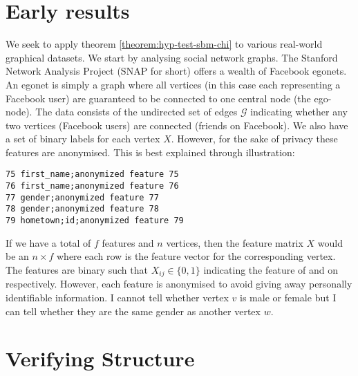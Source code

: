 \documentclass[]{article}
\newcommand{\Gcal}{\mathcal{G}}
\begin{document}
\section{Early results}

We seek to apply theorem \ref{theorem:hyp-test-sbm-chi} to various real-world graphical datasets. We start by analysing social network graphs. The Stanford Network Analysis Project (SNAP for short) \cite{snapnets} offers a wealth of Facebook egonets. An egonet is simply a graph where all vertices (in this case each representing a Facebook user) are guaranteed to be connected to one central node (the ego-node). The data consists of the undirected set of edges $\Gcal$ indicating whether any two vertices (Facebook users) are connected (friends on Facebook). We also have a set of binary labels for each vertex $X$. However, for the sake of privacy these features are anonymised. This is best explained through illustration:
%
\begin{verbatim}
75 first_name;anonymized feature 75
76 first_name;anonymized feature 76
77 gender;anonymized feature 77
78 gender;anonymized feature 78
79 hometown;id;anonymized feature 79
\end{verbatim}

If we have a total of $f$ features and $n$ vertices, then the feature matrix $X$ would be an $n \times f$ where each row is the feature vector for the corresponding vertex. The features are binary such that $X_{ij} \in \{0, 1\}$ indicating the feature of and on respectively. However, each feature is anonymised to avoid giving away personally identifiable information. I cannot tell whether vertex $v$ is male or female but I can tell whether they are the same gender as another vertex $w$.


\section{Verifying Structure}
\end{document}
